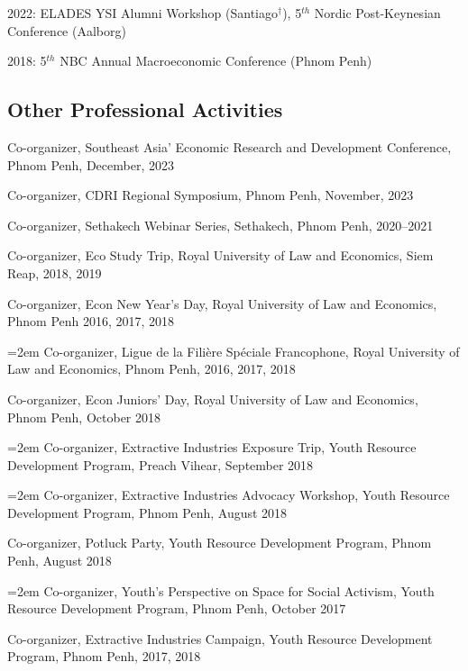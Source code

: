 \documentclass[10pt,a4paper]{article}
\begin{document}
2022:  ELADES YSI Alumni Workshop (Santiago$^\dag$), 5$^{th}$ Nordic Post-Keynesian Conference (Aalborg)

2018: 5$^{th}$ NBC Annual Macroeconomic Conference (Phnom Penh)

\subsection*{Other Professional Activities}

	Co-organizer, Southeast Asia' Economic Research and Development Conference, Phnom Penh, December, 2023
	
	Co-organizer, CDRI Regional Symposium, Phnom Penh, November, 2023
	
	Co-organizer, Sethakech Webinar Series, Sethakech, Phnom Penh, 2020--2021

	Co-organizer, Eco Study Trip, Royal University of Law and Economics, Siem Reap, 2018, 2019

	Co-organizer, Econ New Year's Day, Royal University of Law and Economics, Phnom Penh 2016, 2017, 2018

\hangindent=2em
	Co-organizer, Ligue de la Filière Spéciale Francophone, Royal University of Law and Economics, Phnom Penh, 2016, 2017, 2018
		
	Co-organizer, Econ Juniors' Day, Royal University of Law and Economics, Phnom Penh, October 2018
		
\hangindent=2em
	Co-organizer, Extractive Industries Exposure Trip, Youth Resource Development Program, Preach Vihear, September 2018

\hangindent=2em
	Co-organizer, Extractive Industries Advocacy Workshop, Youth Resource Development Program, Phnom Penh, August 2018
		
	Co-organizer, Potluck Party, Youth Resource Development Program, Phnom Penh, August 2018

\hangindent=2em
	Co-organizer, Youth's Perspective on Space for Social Activism, Youth Resource Development Program, Phnom Penh, October 2017
		
	Co-organizer, Extractive Industries Campaign, Youth Resource Development Program, Phnom Penh, 2017, 2018

\end{document}
